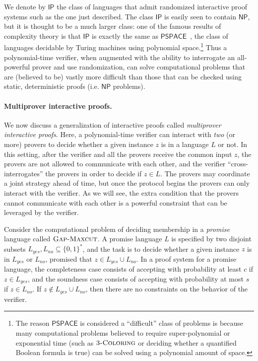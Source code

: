 \documentclass[11pt]{article}
\theoremstyle{definition}
\newcommand{\GX}{\textsc{Gap-Maxcut}}
\newcommand{\class}[1]{\ensuremath{\mathsf{#1}}\xspace}
\newcommand{\NP}{\class{NP}} \newcommand{\IP}{\class{IP}} \newcommand{\EXP}{\class{EXP}} \newcommand{\NEXP}{\class{NEXP}} \newcommand{\QMA}{\class{QMA}} \newcommand{\QMIP}{\class{QMIP}} \WithSuffix\newcommand\QMIP*{\ensuremath{\class{QMIP}^*}} \newcommand{\PSPACE}{\class{PSPACE}} \newcommand{\PCP}{\class{PCP}} \newcommand{\MIP}{\class{MIP}} \newcommand{\MIPco}{\class{MIP}^{\mathrm{co}}} \newcommand{\RE}{\class{RE}} \newcommand{\coRE}{\class{coRE}}
\begin{document}
We denote by $\IP$ the class of languages that admit randomized interactive proof systems such as the one just described. 
The class $\IP$ is easily seen to contain $\NP$, but it is thought to be a much larger class: one of the famous results of complexity theory is that $\IP$ is exactly the same as $\mathsf{PSPACE}$~\cite{lund1990algebraic,shamir1990ip}, the class of languages decidable by Turing machines using polynomial space.\footnote{The reason $\mathsf{PSPACE}$ is considered a ``difficult'' class of problems is because many computational problems believed to require super-polynomial or exponential time (such as $\textsc{3-Coloring}$ or deciding whether a quantified Boolean formula is true) can be solved using a polynomial amount of space.} Thus a polynomial-time verifier, when augmented with the ability to interrogate an all-powerful prover and use randomization, can solve computational problems that are (believed to be) vastly more difficult than those that can be checked using static, deterministic proofs (i.e. $\mathsf{NP}$ problems).

\paragraph{Multiprover interactive proofs.}
We now discuss a generalization of interactive proofs called \emph{multiprover interactive proofs}. Here, a polynomial-time verifier can interact with \emph{two} (or more) provers to decide whether a given instance $z$ is in a language $L$ or not. In this setting, after the verifier and all the provers receive the common input $z$, the provers are not allowed to communicate with each other, and the verifier ``cross-interrogates'' the provers in order to decide if $z \in L$. The provers may coordinate a joint strategy ahead of time, but once the protocol begins the provers can only interact with the verifier. As we will see, the extra condition that the provers cannot communicate with each other is a powerful constraint that can be leveraged by the verifier.





Consider the computational problem of deciding membership in a \emph{promise} language called $\GX$. 
A promise language $L$ is specified by two disjoint subsets $L_{yes},L_{no}\subseteq\{0,1\}^*$, and the task is to decide whether a given instance $z$ is in $L_{yes}$ or $L_{no}$, promised that $z \in L_{yes} \cup L_{no}$. In a proof system for a promise language, the completeness case consists of accepting with probability at least $c$ if $z \in L_{yes}$, and the soundness case consists of accepting with probability at most $s$ if $z \in L_{no}$. If $z \notin L_{yes} \cup L_{no}$, then there are no constraints on the behavior of the verifier.
\end{document}
